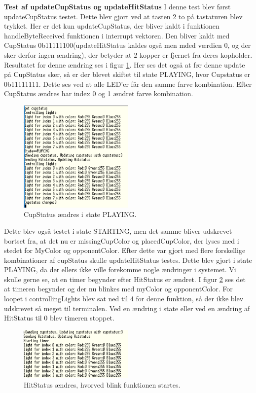 \documentclass[Modultest/Modultest_main.tex]{subfiles}
\begin{document}
\textbf{Test af updateCupStatus og updateHitStatus}
I denne test blev først updateCupStatus testet. Dette blev gjort ved at tasten 2 to på tastaturen blev trykket. Her er det kun updateCupStatus, der bliver kaldt i funktionen handleByteReceived funktionen i interrupt vektoren. Den bliver kaldt med CupStatus 0b11111100(updateHitStatus kaldes også men mded værdien 0, og der sker derfor ingen ændring), der betyder at 2 kopper er fjernet fra deres kopholder. Resultatet for denne ændring ses i figur \ref{fig:cupstatus_change}. Her ses det også at før denne update på CupStatus sker, så er der blevet skiftet til state PLAYING, hvor Cupstatus er 0b11111111. Dette ses ved at alle LED'er får den samme farve kombination. Efter CupStatus ændres har index 0 og 1 ændret farve kombination.
\begin{figure}[H]
    \centering
    \includegraphics[width=0.5\textwidth]{Modultest/playerside_GameController/graphics/PLAYING_cupstatus_change.PNG}
    \caption{CupStatus ændres i state PLAYING.}
    \label{fig:cupstatus_change}
\end{figure}
Dette blev også testet i state STARTING, men det samme bliver udskrevet bortset fra, at det nu er missingCupColor og placedCupColor, der lyses med i stedet for MyColor og opponentColor. 
Efter dette var gjort med flere forskellige kombinationer af cupStatus skulle updateHitStatus testes. Dette blev gjort i state PLAYING, da der ellers ikke ville forekomme nogle ændringer i systemet. Vi skulle gerne se, at en timer begynder efter HitStatus er ændret. I figur \ref{fig:HitStatus_change} ses det at timeren begynder og der nu blinkes med myColor og opponentColor. For loopet i controllingLights blev sat ned til 4 for denne funktion, så der ikke blev udskrevet så meget til terminalen. Ved en ændring i state eller ved en ændring af HitStatus til 0 blev timeren stoppet.
\begin{figure}[H]
    \centering
    \includegraphics[width=0.5\textwidth]{Modultest/playerside_GameController/graphics/HIT_timer.PNG}
    \caption{HitStatus ændres, hvorved blink funktionen startes.}
    \label{fig:HitStatus_change}
\end{figure}
\end{document}
